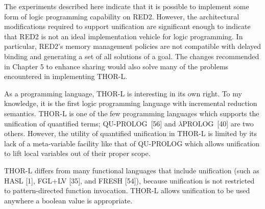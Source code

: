 The experiments described here indicate that it is possible to implement some
form of logic programming capability on RED2. However, the architectural
modifications required to support unification are significant enough to indicate
that RED2 is not an ideal implementation vehicle for logic programming. In
particular, RED2's memory management policies are not compatible with delayed
binding and generating a set of all solutions of a goal. The changes
recommended in Chapter 5 to enhance sharing would also solve many of the
problems encountered in implementing THOR-L.

As a programming language, THOR-L is interesting in its own right. To my
knowledge, it is the first logic programming language with incremental reduction
semantics. THOR-L is one of the few programming languages which supports the
unification of quantified terms; QU-PROLOG~[56] and \(\lambda\)PROLOG~[40] are
two others. However, the utility of quantified unification in THOR-L is limited
by its lack of a meta-variable facility like that of QU-PROLOG which allows
unification to lift local variables out of their proper scope.

THOR-L differs from many functional languages that include unification (such as
HASL [1], FGL+LV [35], and FRESH [54]), because unification is not restricted to
pattern-directed function invocation. THOR-L allows unification to be used
anywhere a boolean value is appropriate.
